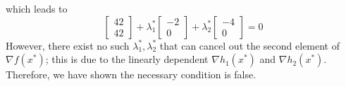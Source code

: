 which leads to
\begin{equation}
    \begin{bmatrix} 42 \\ 42 \end{bmatrix} + \lambda_1^* \begin{bmatrix} -2 \\ 0 \end{bmatrix} + \lambda_2^* \begin{bmatrix} -4 \\ 0 \end{bmatrix} = 0
\end{equation}
However, there exist no such $\lambda_1^*, \lambda_2^*$ that can cancel out the second element of $\nabla f(x^*)$; this is due to the linearly dependent $\nabla h_1(x^*)$ and $\nabla h_2(x^*)$. Therefore, we have shown the necessary condition is false. 

\QEDB

